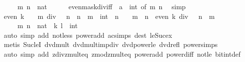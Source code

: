 \begin{isabellebody}
\ \ \ \ \ m\ n\ {\isacharcolon}{\kern0pt}{\isacharcolon}{\kern0pt}\ nat\isanewline
\ \ \ \ \isamarkupfalse%
\ even{\isacharunderscore}{\kern0pt}mask{\isacharunderscore}{\kern0pt}div{\isacharunderscore}{\kern0pt}iff{\isacharprime}{\kern0pt}\ {\isacharbrackleft}{\kern0pt}\ {\isacharquery}{\kern0pt}{\isacharprime}{\kern0pt}a\ {\isacharequal}{\kern0pt}\ int{\isacharcomma}{\kern0pt}\ of\ m\ n{\isacharbrackright}{\kern0pt}\ \isamarkupfalse%
\ simp\isanewline
\ \ \isamarkupfalse%
\ {\isacartoucheopen}even\ {\isacharparenleft}{\kern0pt}k\ {\isacharasterisk}{\kern0pt}\ {}\ {\isacharcircum}{\kern0pt}\ m\ div\ {}\ {\isacharcircum}{\kern0pt}\ n{\isacharparenright}{\kern0pt}\ {\isasymlongleftrightarrow}\ n\ {\isacharless}{\kern0pt}\ m\ {\isasymor}\ {\isacharparenleft}{\kern0pt}{}{\isacharcolon}{\kern0pt}{\isacharcolon}{\kern0pt}int{\isacharparenright}{\kern0pt}\ {\isacharcircum}{\kern0pt}\ n\ {\isacharequal}{\kern0pt}\ {}\ {\isasymor}\ m\ {\isasymle}\ n\ {\isasymand}\ even\ {\isacharparenleft}{\kern0pt}k\ div\ {}\ {\isacharcircum}{\kern0pt}\ {\isacharparenleft}{\kern0pt}n\ {\isacharminus}{\kern0pt}\ m{\isacharparenright}{\kern0pt}{\isacharparenright}{\kern0pt}{\isacartoucheclose}\isanewline
\ \ \ \ \ m\ n\ {\isacharcolon}{\kern0pt}{\isacharcolon}{\kern0pt}\ nat\ \ k\ l\ {\isacharcolon}{\kern0pt}{\isacharcolon}{\kern0pt}\ int\isanewline
\ \ \ \ \isamarkupfalse%
\ {\isacharparenleft}{\kern0pt}auto\ simp\ add{\isacharcolon}{\kern0pt}\ not{\isacharunderscore}{\kern0pt}less\ power{\isacharunderscore}{\kern0pt}add\ ac{\isacharunderscore}{\kern0pt}simps\ dest{\isacharbang}{\kern0pt}{\isacharcolon}{\kern0pt}\ le{\isacharunderscore}{\kern0pt}Suc{\isacharunderscore}{\kern0pt}ex{\isacharparenright}{\kern0pt}\isanewline
\ \ \ \ \isamarkupfalse%
\ {\isacharparenleft}{\kern0pt}metis\ Suc{\isacharunderscore}{\kern0pt}leI\ dvd{\isacharunderscore}{\kern0pt}mult\ dvd{\isacharunderscore}{\kern0pt}mult{\isacharunderscore}{\kern0pt}imp{\isacharunderscore}{\kern0pt}div\ dvd{\isacharunderscore}{\kern0pt}power{\isacharunderscore}{\kern0pt}le\ dvd{\isacharunderscore}{\kern0pt}refl\ power{\isachardot}{\kern0pt}simps{\isacharparenleft}{\kern0pt}{}{\isacharparenright}{\kern0pt}{\isacharparenright}{\kern0pt}\isanewline
\ \ \ \ \isamarkupfalse%
\isanewline
{}\isamarkupfalse%
\ {\isacharparenleft}{\kern0pt}auto\ simp\ add{\isacharcolon}{\kern0pt}\ zdiv{\isacharunderscore}{\kern0pt}zmult{}{\isacharunderscore}{\kern0pt}eq\ zmod{\isacharunderscore}{\kern0pt}zmult{}{\isacharunderscore}{\kern0pt}eq\ power{\isacharunderscore}{\kern0pt}add\ power{\isacharunderscore}{\kern0pt}diff\ not{\isacharunderscore}{\kern0pt}le\ bit{\isacharunderscore}{\kern0pt}int{\isacharunderscore}{\kern0pt}def{\isacharparenright}{\kern0pt}%

\end{isabellebody}
